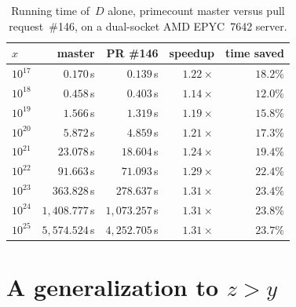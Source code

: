 \documentclass[11pt,a4paper]{amsart}
\numberwithin{equation}{section}
\begin{document}
\begin{table}[htb]
\caption{Running time of~$D$ alone, primecount master versus pull
request~\#146, on a dual-socket AMD EPYC~7642 server.}\label{tab:runtime}
\centering
\begin{tabular}{@{}lrrrr@{}}
\toprule
$x$ & master & PR \#146 & speedup & time saved\\
\midrule
$10^{17}$ & $0.170$\,s & $0.139$\,s & $1.22\times$ & $18.2\%$\\
$10^{18}$ & $0.458$\,s & $0.403$\,s & $1.14\times$ & $12.0\%$\\
$10^{19}$ & $1.566$\,s & $1.319$\,s & $1.19\times$ & $15.8\%$\\
$10^{20}$ & $5.872$\,s & $4.859$\,s & $1.21\times$ & $17.3\%$\\
$10^{21}$ & $23.078$\,s & $18.604$\,s & $1.24\times$ & $19.4\%$\\
$10^{22}$ & $91.663$\,s & $71.093$\,s & $1.29\times$ & $22.4\%$\\
$10^{23}$ & $363.828$\,s & $278.637$\,s & $1.31\times$ & $23.4\%$\\
$10^{24}$ & $1{,}408.777$\,s & $1{,}073.257$\,s & $1.31\times$ & $23.8\%$\\
$10^{25}$ & $5{,}574.524$\,s & $4{,}252.705$\,s & $1.31\times$ & $23.7\%$\\
\bottomrule
\end{tabular}
\end{table}

\let\savedFloatBarrier\FloatBarrier
\let\FloatBarrier\relax
\section{A generalization to \texorpdfstring{$z>y$}{z > y}}\label{sec:general}
\let\FloatBarrier\savedFloatBarrier
\end{document}
